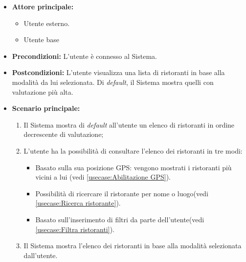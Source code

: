\label{usecase:Consultazione elenco ristoranti}
\begin{itemize}
	\item \textbf{Attore principale:} 
    \begin{itemize}
        \item Utente esterno.
        \item Utente base
    \end{itemize}

	\item \textbf{Precondizioni:}
	      L'utente è connesso al Sistema.

	\item \textbf{Postcondizioni:} L'utente visualizza una lista di ristoranti in base alla modalità da lui selezionata.
    Di \textit{default}, il Sistema mostra quelli con valutazione più alta.

	\item \textbf{Scenario principale:}
	      \begin{enumerate}
              \item Il Sistema mostra di \textit{default} all'utente un elenco di ristoranti in ordine decrescente di valutazione;
              
		      \item L'utente ha la possibilità di consultare l'elenco dei ristoranti in tre modi:
		      \begin{itemize}
                \item Basato sulla sua posizione GPS: vengono mostrati i ristoranti più vicini a lui (vedi \autoref{usecase:Abilitazione GPS}).
                \item Possibilità di ricercare il ristorante per nome o luogo(vedi \autoref{usecase:Ricerca ristorante}).
                \item Basato sull'inserimento di filtri da parte dell'utente(vedi \autoref{usecase:Filtra ristoranti}).
              \end{itemize}

		      \item Il Sistema mostra l'elenco dei ristoranti in base alla modalità selezionata dall'utente.
		    
	      \end{enumerate}
\end{itemize}

